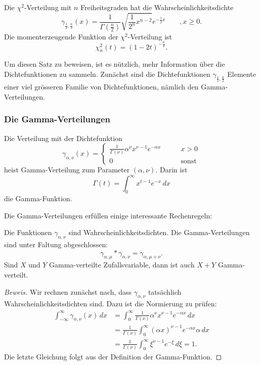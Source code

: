 {\small

\begin{satz}\label{chi2}
Die $\chi^2$-Verteilung mit $n$ Freiheitsgraden hat
die Wahrscheinlichkeitsdichte
\[
\gamma_{\frac12,\frac{n}2}(x)
=
\frac1{\Gamma(\frac{n}2)}\sqrt{\frac1{2^n}x^{n-2}}e^{-\frac12x}\qquad,x\ge 0.
\]
Die momenterzeugende Funktion der $\chi^2$-Verteilung ist
\[
\chi_n^2(t)=(1-2t)^{-\frac{n}2}.
\]
\end{satz}

Um diesen Satz zu beweisen, ist es nützlich, mehr Information über die
Dichtefunktionen zu sammeln.
Zunächst sind die Dichtefunktionen
$\gamma_{\frac12,\frac{n}2}$ Elemente einer viel grösseren Familie von
Dichtefunktionen, nämlich den Gamma-Verteilungen.

\subsubsection{Die Gamma-Verteilungen}
\begin{definition}
Die Verteilung mit der Dichtefunktion
\[
\gamma_{\alpha,\nu}(x)=\begin{cases}
\displaystyle \frac1{\Gamma(\nu)}\alpha^\nu x^{\nu-1}e^{-\alpha x}&\qquad x>0\\
0&\qquad\text{sonst}
\end{cases}
\]
heist Gamma-Verteilung zum Parameter $(\alpha,\nu)$.
Darin ist
\[
\Gamma(t)=\int_0^\infty x^{t-1}e^{-x}\,dx
\]
die Gamma-Funktion.
\end{definition}

Die Gamma-Verteilungen erfüllen einige interessante Rechenregeln:
\begin{satz} Die Funktionen $\gamma_{\alpha,\nu}$ sind Wahrscheinlichkeitsdichten.
Die Gamma-Verteilungen sind unter Faltung abgeschlossen:
\[
\gamma_{\alpha,\mu}*\gamma_{\alpha,\nu}=\gamma_{\alpha,\mu+\nu}.
\]
Sind $X$ und $Y$ Gamma-verteilte Zufallsvariable, dann ist auch $X+Y$
Gamma-verteilt.
\end{satz}
\begin{proof}[Beweis]
Wir rechnen zunächst nach, dass $\gamma_{\alpha,\nu}$ tatsächlich
Wahrscheinlichkeitsdichten sind.
Dazu ist die Normierung zu prüfen:
\begin{align*}
\int_{-\infty}^\infty \gamma_{\alpha,\nu}(x)\,dx
&=\int_0^\infty\frac1{\Gamma(\nu)}\alpha^\nu x^{\nu-1}e^{-\alpha x}\,dx\\
&=\frac{1}{\Gamma(\nu)}\int_0^\infty (\alpha x)^{\nu-1}e^{-\alpha x}
\alpha\,dx\\
&=\frac1{\Gamma(\nu)}\int_0^\infty \xi^{\nu-1}e^{-\xi}\,d\xi=1.
\end{align*}
Die letzte Gleichung folgt aus der Definition der Gamma-Funktion.


\end{proof}}
